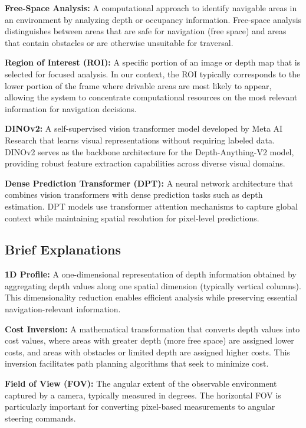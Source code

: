 \documentclass[conference]{IEEEtran}
\begin{document}
\textbf{Free-Space Analysis:} A computational approach to identify navigable areas in an environment by analyzing depth or occupancy information. Free-space analysis distinguishes between areas that are safe for navigation (free space) and areas that contain obstacles or are otherwise unsuitable for traversal.

\textbf{Region of Interest (ROI):} A specific portion of an image or depth map that is selected for focused analysis. In our context, the ROI typically corresponds to the lower portion of the frame where drivable areas are most likely to appear, allowing the system to concentrate computational resources on the most relevant information for navigation decisions.

\textbf{DINOv2:} A self-supervised vision transformer model developed by Meta AI Research that learns visual representations without requiring labeled data. DINOv2 serves as the backbone architecture for the Depth-Anything-V2 model, providing robust feature extraction capabilities across diverse visual domains.

\textbf{Dense Prediction Transformer (DPT):} A neural network architecture that combines vision transformers with dense prediction tasks such as depth estimation. DPT models use transformer attention mechanisms to capture global context while maintaining spatial resolution for pixel-level predictions.

\subsection{Brief Explanations}
\textbf{1D Profile:} A one-dimensional representation of depth information obtained by aggregating depth values along one spatial dimension (typically vertical columns). This dimensionality reduction enables efficient analysis while preserving essential navigation-relevant information.

\textbf{Cost Inversion:} A mathematical transformation that converts depth values into cost values, where areas with greater depth (more free space) are assigned lower costs, and areas with obstacles or limited depth are assigned higher costs. This inversion facilitates path planning algorithms that seek to minimize cost.

\textbf{Field of View (FOV):} The angular extent of the observable environment captured by a camera, typically measured in degrees. The horizontal FOV is particularly important for converting pixel-based measurements to angular steering commands.
\end{document}
